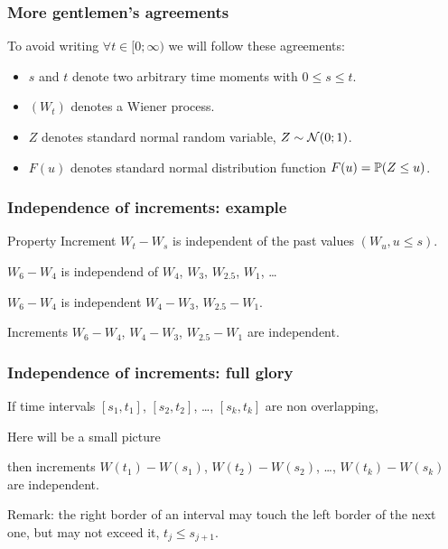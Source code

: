 \begin{frame}
  \frametitle{More gentlemen's agreements}

  To avoid writing $\forall t \in [0;\infty)$ we will follow these agreements:
  \begin{itemize}[<+->]
    \item $s$ and $t$ denote two arbitrary time moments with $0 \leq s \leq t$.
    \item $(W_t)$ denotes a Wiener process.
    \item $Z$ denotes standard normal random variable, $Z \sim \cN(0;1)$.
    \item $F(u)$ denotes standard normal distribution function $F(u) = \P(Z \leq u)$.
  \end{itemize}
  

\end{frame}



\begin{frame}
  \frametitle{Independence of increments: example}
  \begin{block}{Property}
    Increment $W_t - W_s$ is independent of the past values $(W_u, u\leq s)$.  
  \end{block}

  \pause 
  $W_6 - W_4$ is independend of $W_4$, $W_{3}$, $W_{2.5}$, $W_1$, \ldots 

  \pause 
  $W_6 - W_4$ is independent $W_4 - W_3$, $W_{2.5} - W_{1}$.

  \pause
  Increments $W_6 - W_4$, $W_4 - W_3$, $W_{2.5} - W_1$ are independent. 

\end{frame}


\begin{frame}
  \frametitle{Independence of increments: full glory}


  If time intervals $[s_1, t_1]$, $[s_2, t_2]$, \ldots, $[s_k, t_k]$ are
  \alert{non overlapping},

  Here will be a small picture 

  \pause 
  then increments $W(t_1) - W(s_1)$, $W(t_2) - W(s_2)$, \ldots, $W(t_k) - W(s_k)$ are independent. 

  \pause
  Remark: the right border of an interval \alert{may touch} the left border of the next one,
  but \alert{may not exceed} it, $t_j \leq s_{j+1}$. 

\end{frame}


